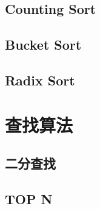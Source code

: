 \subsection{Counting Sort}

\subsection{Bucket Sort}

\subsection{Radix Sort}

\section{查找算法}

\subsection{二分查找}

\subsection{TOP N}

